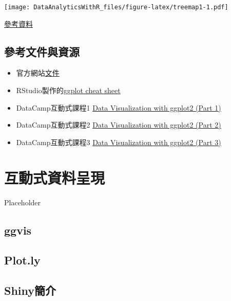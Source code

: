 \documentclass[
]{book}
\providecommand{\tightlist}{%
  \setlength{\itemsep}{0pt}\setlength{\parskip}{0pt}}
\begin{document}
\texttt{[image: DataAnalyticsWithR\_files/figure-latex/treemap1-1.pdf]}

\href{https://github.com/wilkox/treemapify}{參考資料}

\hypertarget{ux53c3ux8003ux6587ux4ef6ux8207ux8cc7ux6e90}{%
\section{參考文件與資源}\label{ux53c3ux8003ux6587ux4ef6ux8207ux8cc7ux6e90}}

\begin{itemize}
\tightlist
\item
  官方網站\href{http://docs.ggplot2.org/current/}{文件}
\item
  RStudio製作的\href{https://www.rstudio.com/wp-content/uploads/2016/11/ggplot2-cheatsheet-2.1.pdf}{ggplot cheat sheet}
\item
  DataCamp互動式課程1 \href{https://www.datacamp.com/courses/data-visualization-with-ggplot2-1}{Data Visualization with ggplot2 (Part 1)}
\item
  DataCamp互動式課程2 \href{https://www.datacamp.com/courses/data-visualization-with-ggplot2-2}{Data Visualization with ggplot2 (Part 2)}
\item
  DataCamp互動式課程3 \href{https://www.datacamp.com/courses/data-visualization-with-ggplot2-3}{Data Visualization with ggplot2 (Part 3)}
\end{itemize}

\hypertarget{InteractiveGraphics}{%
\chapter{互動式資料呈現}\label{InteractiveGraphics}}

Placeholder

\hypertarget{ggvis}{%
\section{ggvis}\label{ggvis}}

\hypertarget{plot.ly}{%
\section{Plot.ly}\label{plot.ly}}

\hypertarget{shinyux7c21ux4ecb}{%
\section{Shiny簡介}\label{shinyux7c21ux4ecb}}
\end{document}
